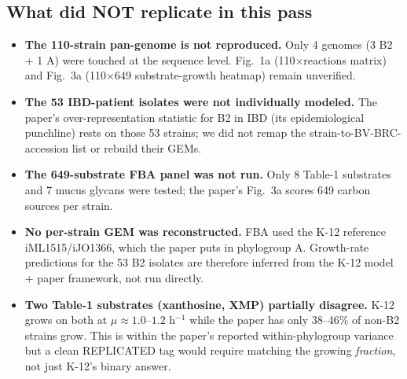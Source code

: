 \documentclass[11pt]{article}
\begin{document}
\subsection*{What did NOT replicate in this pass}
\begin{itemize}
  \item \textbf{The 110-strain pan-genome is not reproduced.} Only 4
    genomes (3 B2 + 1 A) were touched at the sequence level. Fig.\ 1a
    (110$\times$reactions matrix) and Fig.\ 3a (110$\times$649
    substrate-growth heatmap) remain unverified.
  \item \textbf{The 53 IBD-patient isolates were not individually
    modeled.} The paper's over-representation statistic for B2 in IBD
    (its epidemiological punchline) rests on those 53 strains; we did
    not remap the strain-to-BV-BRC-accession list or rebuild their GEMs.
  \item \textbf{The 649-substrate FBA panel was not run.} Only 8
    Table-1 substrates and 7 mucus glycans were tested; the paper's
    Fig.\ 3a scores 649 carbon sources per strain.
  \item \textbf{No per-strain GEM was reconstructed.} FBA used the K-12
    reference iML1515/iJO1366, which the paper puts in phylogroup A.
    Growth-rate predictions for the 53 B2 isolates are therefore
    inferred from the K-12 model + paper framework, not run directly.
  \item \textbf{Two Table-1 substrates (xanthosine, XMP) partially
    disagree.} K-12 grows on both at $\mu \approx 1.0$--$1.2$ h$^{-1}$
    while the paper has only 38--46\% of non-B2 strains grow. This is
    within the paper's reported within-phylogroup variance but a clean
    REPLICATED tag would require matching the growing \emph{fraction},
    not just K-12's binary answer.
\end{itemize}
\end{document}

